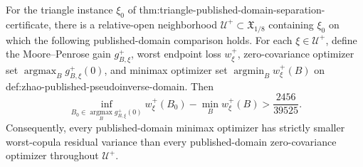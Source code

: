 For the triangle instance \(\xi_0\) of thm:triangle-published-domain-separation-certificate, there is a relative-open neighborhood \(\mathcal U^{+}\subset\mathfrak X_{1/8}\) containing \(\xi_0\) on which the following published-domain comparison holds.  For each \(\xi\in\mathcal U^{+}\), define the Moore--Penrose gain \(g_{B,\xi}^{+}\), worst endpoint loss \(w_\xi^{+}\), zero-covariance optimizer set \(\operatorname*{argmax}_B g_{B,\xi}^{+}(0)\), and minimax optimizer set \(\operatorname*{argmin}_B w_\xi^{+}(B)\) on def:zhao-published-pseudoinverse-domain.  Then
\[
\inf_{B_0\in\operatorname*{argmax}_B g_{B,\xi}^{+}(0)}w_\xi^{+}(B_0)
-\min_Bw_\xi^{+}(B)
>\frac{2456}{39525}.
\]
Consequently, every published-domain minimax optimizer has strictly smaller worst-copula residual variance than every published-domain zero-covariance optimizer throughout \(\mathcal U^{+}\).